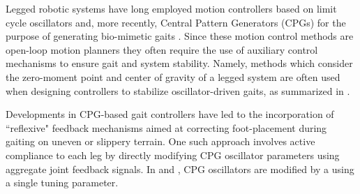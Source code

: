 
Legged robotic systems have long employed motion controllers based on limit cycle oscillators and, more recently, Central Pattern Generators (CPGs)  for the purpose of generating bio-mimetic gaits \cite{Matsuoka1985,Collins1993,Endo2004,Righetti2006,Ijspeert2008,Matos2010,Ajallooeian2013,Park2014,Fukuoka2015}. Since these motion control methods are open-loop motion planners 
they often require the use of auxiliary control mechanisms to ensure gait and system stability. Namely, methods which consider the zero-moment point and center of gravity of a legged system are often used when designing controllers to stabilize oscillator-driven gaits, as summarized in \cite{Wieber2015}. %

Developments in CPG-based gait controllers have led to the incorporation of ``reflexive" feedback mechanisms aimed at correcting foot-placement during gaiting on uneven or slippery terrain. One such approach involves active compliance to each leg by directly modifying CPG oscillator parameters using aggregate joint feedback signals. In \cite{Endo2004} and \cite{Fukuoka2003}, CPG oscillators are modified by a using a single tuning parameter.

